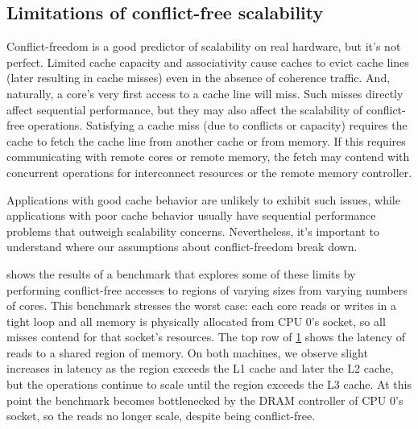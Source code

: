 \subsection{Limitations of conflict-free scalability}
\label{sec:scalability:limits}

Conflict-freedom is a good predictor of scalability on real hardware,
but it's not perfect.  Limited cache capacity and associativity cause
caches to evict cache lines (later resulting in cache
misses) even in the absence of coherence traffic.
%
And, naturally, a core's
very first access to a cache line will miss.  Such misses directly
affect sequential performance, but they may also affect the
scalability of conflict-free operations.
%
Satisfying a cache miss (due to conflicts or capacity) requires the
cache to fetch the cache line from another cache or from memory.
%
If this requires communicating with remote cores or remote memory, the
fetch may contend with concurrent operations for interconnect
resources or the remote memory controller.

Applications with good cache behavior are unlikely to exhibit such
issues, while applications with poor cache behavior usually have
sequential performance problems that outweigh scalability concerns.
Nevertheless, it's important to understand where our assumptions about
conflict-freedom break down.

\begin{figure}
  \centering
  \label{fig:memscan}
\end{figure}

 shows the results of a benchmark that explores some
of these limits by performing conflict-free accesses to regions of
varying sizes from varying numbers of cores.
%
This benchmark stresses the worst case: each core reads or writes in a
tight loop and all memory is physically allocated from CPU 0's socket,
so all misses contend for that socket's resources.
%
The top row of \cref{fig:memscan} shows the latency of reads to a
shared region of memory.
%
On both
machines, we observe slight increases in latency as the region exceeds
the L1 cache and later the L2 cache, but the operations continue to
scale until the region exceeds the L3 cache.  At this point the
benchmark becomes bottlenecked by the DRAM controller of CPU 0's
socket, so the reads no longer scale, despite being conflict-free.

